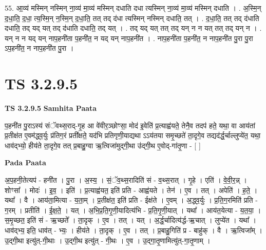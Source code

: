 \documentclass[17pt]{extarticle}
\begin{document}
55. आ॒व्य॑ मस्मिन् नस्मिन् ना॒व्य॑ मा॒व्य॑ मस्मिन् दधाति दधा त्यस्मिन् ना॒व्य॑ मा॒व्य॑ मस्मिन् दधाति । . अ॒स्मि॒न् द॒धा॒ति॒ द॒धा॒ त्य॒स्मि॒न् न॒स्मि॒न् द॒धा॒ति॒ तत् तद् द॑धा त्यस्मिन् नस्मिन् दधाति॒ तत् । . द॒धा॒ति॒ तत् तद् द॑धाति दधाति॒ तद् यद् यत् तद् द॑धाति दधाति॒ तद् यत् । . तद् यद् यत् तत् तद् यन् न न यत् तत् तद् यन् न । . यन् न न यद् यन् नाप॒हनी॑ता प॒हनी॑त॒ न यद् यन् नाप॒हनी॑त । . नाप॒हनी॑ता प॒हनी॑त॒ न नाप॒हनी॑त पु॒रा पु॒रा ऽप॒हनी॑त॒ न नाप॒हनी॑त पु॒रा । \newline
\pagebreak
{}

\section{ TS 3.2.9.5 }

\textbf{TS 3.2.9.5 } \newline
\textbf{Samhita Paata} \newline

प॒हनी॑त पु॒राऽस्य॑ संॅवथ्स॒राद्-गृ॒ह आ वे॑वीर॒ञ्छोꣳसा॒ मोद॑ इ॒वेति॑ प्र॒त्याह्व॑यते॒ तेनै॒व तदप॑ हते॒ यथा॒ वा आय॑तां प्र॒तीक्ष॑त ए॒वम॑द्ध्व॒र्युः प्र॑तिग॒रं प्रती᳚क्षते॒ यद॑भि प्रतिगृणी॒याद्यथा ऽऽय॑तया समृ॒च्छते॑ ता॒दृगे॒व तद्यद॑र्द्ध॒र्चाल्लुप्ये॑त॒ यथा॒ धाव॑द्भ्यो॒ हीय॑ते ता॒दृगे॒व तत् प्र॒बाहु॒ग्वा ऋ॒त्विजा॑मुद्गी॒था उ॑द्गी॒थ ए॒वोद्-गा॑तृ॒णा - [  ] \newline

\textbf{Pada Paata} \newline

अ॒प॒हनी॒तेत्यप॑ - हनी॑त । पु॒रा । अ॒स्य॒ । सं॒ॅव॒थ्स॒रादिति॑ सं - व॒थ्स॒रात् । गृ॒हे । एति॑ । वे॒वी॒र॒न्न् । शोꣳसा᳚ । मोदः॑ । इ॒व॒ । इति॑ । प्र॒त्याह्व॑यत॒ इति॑ प्रति - आह्व॑यते । तेन॑ । ए॒व । तत् । अपेति॑ । ह॒ते॒ । यथा᳚ । वै । आय॑ता॒मित्या - य॒ता॒म् । प्र॒तीक्ष॑त॒ इति॑ प्रति - ईक्ष॑ते । ए॒वम् । अ॒द्ध्व॒र्युः । प्र॒ति॒ग॒रमिति॑ प्रति - ग॒रम् । प्रतीति॑ । ई॒क्ष॒ते॒ । यत् । अ॒भि॒प्र॒ति॒गृ॒णी॒यादित्य॑भि - प्र॒ति॒गृ॒णी॒यात् । यथा᳚ । आय॑त॒येत्या - य॒त॒या॒ । स॒मृ॒च्छत॒ इति॑ सं - ऋ॒च्छते᳚ । ता॒दृक् । ए॒व । तत् । यत् । अ॒र्द्ध॒र्चादित्य॑र्द्ध-ऋ॒चात् । लुप्ये॑त । यथा᳚ । धाव॑द्भ्य॒ इति॒ धाव॑त् - भ्यः॒ । हीय॑ते । ता॒दृक् । ए॒व । तत् । प्र॒बाहु॒गिति॑ प्र - बाहु॑क् । वै । ऋ॒त्विजा᳚म् । उ॒द्गी॒था इत्यु॑त्-गी॒थाः । उ॒द्गी॒थ इत्यु॑त् - गी॒थः । ए॒व । उ॒द्गा॒तृ॒णामित्यु॑त्-गा॒तृ॒णाम् ।  \newline
\end{document}
